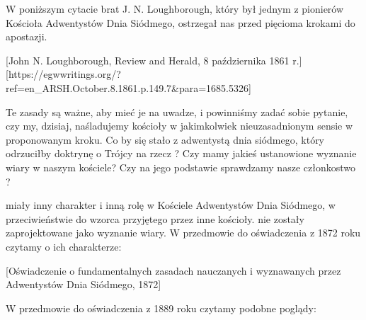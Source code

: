 
W poniższym cytacie brat J. N. Loughborough, który był jednym z pionierów Kościoła Adwentystów Dnia Siódmego, ostrzegał nas przed pięcioma krokami do apostazji.

[John N. Loughborough, Review and Herald, 8 października 1861 r.][https://egwwritings.org/?ref=en\_ARSH.October.8.1861.p.149.7&para=1685.5326]

Te zasady są ważne, aby mieć je na uwadze, i powinniśmy zadać sobie pytanie, czy my, dzisiaj, naśladujemy kościoły w jakimkolwiek nieuzasadnionym sensie w proponowanym kroku. Co by się stało z adwentystą dnia siódmego, który odrzuciłby doktrynę o Trójcy na rzecz ? Czy mamy jakieś ustanowione wyznanie wiary w naszym kościele? Czy na jego podstawie sprawdzamy nasze członkostwo ?


 miały inny charakter i inną rolę w Kościele Adwentystów Dnia Siódmego, w przeciwieństwie do wzorca przyjętego przez inne kościoły.  nie zostały zaprojektowane jako wyznanie wiary. W przedmowie do oświadczenia z 1872 roku czytamy o ich charakterze:

[Oświadczenie o fundamentalnych zasadach nauczanych i wyznawanych przez Adwentystów Dnia Siódmego, 1872]

W przedmowie do oświadczenia z 1889 roku czytamy podobne poglądy:


